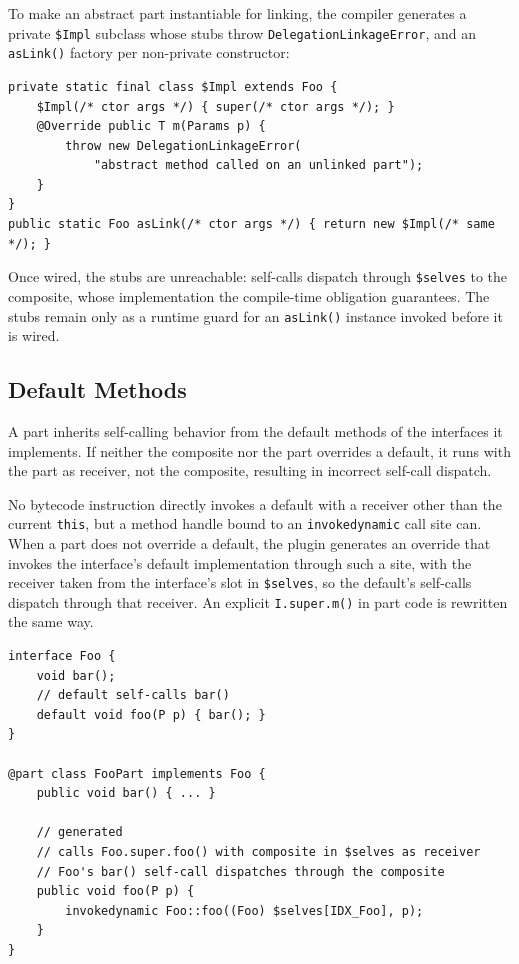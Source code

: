 \documentclass[acmsmall,nonacm]{acmart}
\theoremstyle{acmplain}
\theoremstyle{acmdefinition}
\newcommand{\code}[1]{\texttt{#1}}
\begin{document}
To make an abstract part instantiable for linking, the compiler generates a
private \code{\$Impl} subclass whose stubs throw \code{DelegationLinkageError},
and an \code{asLink()} factory per non-private constructor:

\begin{lstlisting}
private static final class $Impl extends Foo {
    $Impl(/* ctor args */) { super(/* ctor args */); }
    @Override public T m(Params p) {
        throw new DelegationLinkageError(
            "abstract method called on an unlinked part");
    }
}
public static Foo asLink(/* ctor args */) { return new $Impl(/* same */); }
\end{lstlisting}

Once wired, the stubs are unreachable: self-calls dispatch through
\code{\$selves} to the composite, whose implementation the compile-time
obligation guarantees. The stubs remain only as a runtime guard for an
\code{asLink()} instance invoked before it is wired.

\subsection{Default Methods}
\label{subsec:default}

A part inherits self-calling behavior from the default methods of the
interfaces it implements. If neither the composite nor the part
overrides a default, it runs with the part as receiver, not the
composite, resulting in incorrect self-call dispatch.

No bytecode instruction directly invokes a default with a receiver other
than the current \code{this}, but a method handle bound to an \code{invokedynamic}
call site can. When a part does not override a default, the plugin
generates an override that invokes the interface's default implementation through
such a site, with the receiver taken from the interface's slot in \code{\$selves},
so the default's self-calls dispatch through that receiver. An explicit
\code{I.super.m()} in part code is rewritten the same way.

\begin{lstlisting}
interface Foo {
    void bar();
    // default self-calls bar()
    default void foo(P p) { bar(); }
}

@part class FooPart implements Foo {
    public void bar() { ... }

    // generated
    // calls Foo.super.foo() with composite in $selves as receiver
    // Foo's bar() self-call dispatches through the composite
    public void foo(P p) {
        invokedynamic Foo::foo((Foo) $selves[IDX_Foo], p);
    }
}
\end{lstlisting}
\end{document}
